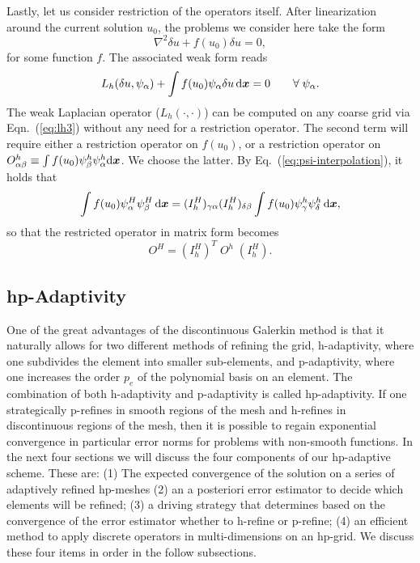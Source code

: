 Lastly, let us consider restriction of the operators itself.  After linearization  around the current solution $u_0$, the problems we consider here take the form
%
\begin{equation}\label{eq:temp-F}
\nabla^2\delta u + f(u_0)\delta u = 0,
\end{equation}
%
for some function $f$. The associated weak form reads
%
\begin{equation}
L_{h}( \delta u, \psi_\alpha) + \int f(u_0)\psi_\alpha \delta u\,\mathrm{d}\boldsymbol{x} = 0\qquad\forall\; \psi_\alpha.
\end{equation}
%
The weak Laplacian operator ($L_{h}(\cdot,\cdot)$) can be computed on any coarse grid via Eqn.~(\ref{eq:lh3}) without any need for a restriction operator. The second term will require either a restriction operator on $f(u_0)$, or a restriction operator on $O^{h}_{\alpha\beta}\equiv\int f(u_0)\psi^h_\beta\psi^h_\alpha \mathrm{d} \boldsymbol{x}$.  We choose the latter. By Eq.~(\ref{eq:psi-interpolation}), it holds that 
  \begin{equation}\label{eq:temp-H}
\int f(u_0) \psi_\alpha^{H}\psi_\beta^{H}\,\mathrm{d}\boldsymbol{x}
    =(I_{h}^{H})_{\gamma\alpha}(I_{h}^{H})_{\delta\beta}\int f(u_0)\psi_\gamma^{h}\psi_\delta^{h}\,\mathrm{d}\boldsymbol{x},
  \end{equation}
  so that the restricted operator in matrix form becomes
  \begin{equation}
    \label{eqn:operator_oh}
      O^{H} = (I_{h}^{H})^T\;O^{h}\;(I_{h}^{H}).
    \end{equation}

\subsection{hp-Adaptivity}
\label{sec:hp-adaptivity}

One of the great advantages of the discontinuous Galerkin method is
that it naturally allows for two different methods of refining the
grid, h-adaptivity, where one subdivides the element into
smaller sub-elements, and p-adaptivity, where one
increases the order $p_e$ of the polynomial basis on an element. The
combination of both h-adaptivity and p-adaptivity is called
hp-adaptivity. If one strategically p-refines in smooth regions of the
mesh and h-refines in discontinuous regions of the mesh, then it is
possible to regain exponential convergence in particular error norms
for problems with non-smooth functions. In the next four sections we
will discuss the four components of our hp-adaptive scheme. These are:
(1) The expected convergence of the solution on a series of adaptively refined hp-meshes (2) an a posteriori error estimator to decide which elements will be refined; (3) a driving strategy that determines based
on the convergence of the error estimator whether to h-refine
or p-refine; (4) an efficient method to apply discrete operators in multi-dimensions on an hp-grid. We discuss these four items in order in the follow subsections.

